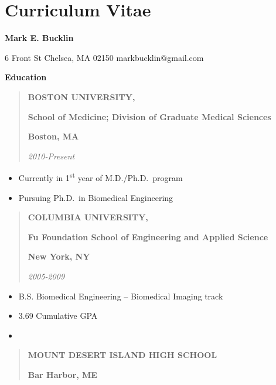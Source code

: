 \hypertarget{cv}{%
\chapter*{Curriculum Vitae}\label{sec:cv}}

\thispagestyle{empty}

\begin{center}
{\large {\bf Mark E. Bucklin}}
\end{center}

6 Front St
Chelsea, MA 02150
markbucklin@gmail.com

\textbf{Education}

\begin{quote}
\textbf{BOSTON UNIVERSITY,}

\textbf{School of Medicine; Division of Graduate Medical Sciences}

\textbf{Boston, MA}

\emph{2010-Present}
\end{quote}

\begin{itemize}
\item
  Currently in 1\textsuperscript{st} year of M.D./Ph.D.~program
\item
  Pursuing Ph.D.~in Biomedical Engineering
\end{itemize}

\begin{quote}
\textbf{COLUMBIA UNIVERSITY,}

\textbf{Fu Foundation School of Engineering and Applied Science}

\textbf{New York, NY}

\emph{2005-2009}
\end{quote}

\begin{itemize}
\item
  B.S. Biomedical Engineering -- Biomedical Imaging track
\item
  3.69 Cumulative GPA
\item
\end{itemize}

\begin{quote}
\textbf{MOUNT DESERT ISLAND HIGH SCHOOL}

\textbf{Bar Harbor, ME}
\end{quote}

